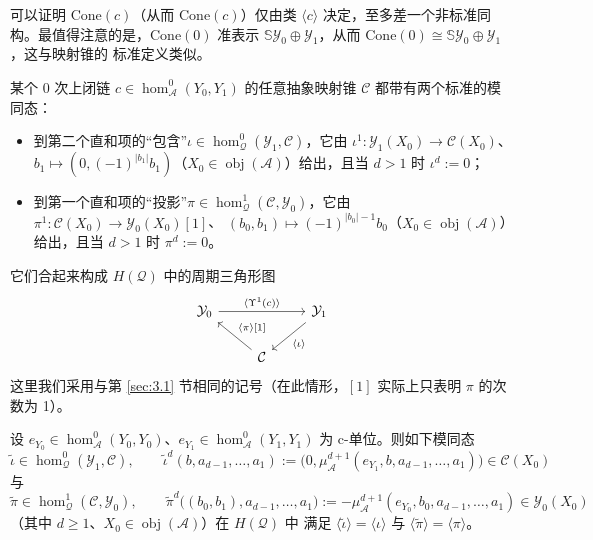 可以证明 $\mathrm{Cone}(c)$（从而 $\mathrm{Cone}(c)$）仅由类 $\langle c\rangle$
决定，至多差一个非标准同构。最值得注意的是，$\mathrm{Cone}(0)$ 准表示
$\mathbb S\mathcal Y_0\oplus\mathcal Y_1$，从而
$\mathrm{Cone}(0)\cong\mathbb S\mathcal Y_0\oplus\mathcal Y_1$，这与映射锥的
标准定义类似。

\begin{Def}\label{def:3.17}
某个 0 次上闭链 $c\in\hom^0_{\mathcal A}(Y_0,Y_1)$ 的任意抽象映射锥
$\mathcal C$ 都带有两个标准的模同态：
\begin{itemize}
  \item 到第二个直和项的“包含”$\iota\in\hom^0_{\mathcal Q}
        (\mathcal Y_1,\mathcal C)$，它由
        $\iota^1:\mathcal Y_1(X_0)\to\mathcal C(X_0)$、
        $b_1\mapsto(0,(-1)^{|b_1|}b_1)$（$X_0\in\operatorname{obj}
        (\mathcal A)$）给出，且当 $d>1$ 时 $\iota^d:=0$；
  \item 到第一个直和项的“投影”$\pi\in\hom^1_{\mathcal Q}
        (\mathcal C,\mathcal Y_0)$，它由
        $\pi^1:\mathcal C(X_0)\to\mathcal Y_0(X_0)[1]$、
        $(b_0,b_1)\mapsto(-1)^{|b_0|-1}b_0$（$X_0\in\operatorname{obj}
        (\mathcal A)$）给出，且当 $d>1$ 时 $\pi^d:=0$。
\end{itemize}
它们合起来构成 $H(\mathcal Q)$ 中的周期三角形图
\begin{equation}\label{eq:3.36}
  \begin{tikzcd}
    \mathcal Y_0 \arrow[rr, "{\langle\Upsilon^1(c)\rangle}"] & &
      \mathcal Y_1 \arrow[dl, "{\langle\iota\rangle}"] \\
    & \mathcal C \arrow[ul, "{\langle\pi\rangle{[}1{]}}"'] &
  \end{tikzcd}
\end{equation}
这里我们采用与第 \ref{sec:3.1} 节相同的记号（在此情形，$[1]$ 实际上只表明
$\pi$ 的次数为 1）。
\end{Def}

\begin{Lem}\label{lem:3.18}
设 $e_{Y_0}\in\hom^0_{\mathcal A}(Y_0,Y_0)$、$e_{Y_1}\in\hom^0_{\mathcal A}
(Y_1,Y_1)$ 为 c-单位。则如下模同态
\[
  \tilde\iota\in\hom^0_{\mathcal Q}(\mathcal Y_1,\mathcal C),\qquad
  \tilde\iota^d(b,a_{d-1},\dots,a_1):=
  \bigl(0,\mu^{d+1}_{\mathcal A}(e_{Y_1},b,a_{d-1},\dots,a_1)\bigr)\in
  \mathcal C(X_0)
\]
与
\[
  \tilde\pi\in\hom^1_{\mathcal Q}(\mathcal C,\mathcal Y_0),\qquad
  \tilde\pi^d\bigl((b_0,b_1),a_{d-1},\dots,a_1\bigr):=
  -\mu^{d+1}_{\mathcal A}(e_{Y_0},b_0,a_{d-1},\dots,a_1)\in
  \mathcal Y_0(X_0)
\]
（其中 $d\ge 1$、$X_0\in\operatorname{obj}(\mathcal A)$）在 $H(\mathcal Q)$ 中
满足 $\langle\tilde\iota\rangle=\langle\iota\rangle$ 与
$\langle\tilde\pi\rangle=\langle\pi\rangle$。
\end{Lem}

